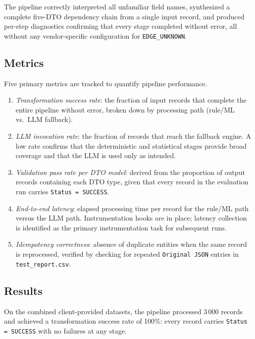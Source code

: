\documentclass{article}
\begin{document}
The pipeline correctly interpreted all unfamiliar field names, synthesized a complete
five-DTO dependency chain from a single input record, and produced per-step diagnostics
confirming that every stage completed without error, all without any vendor-specific
configuration for \texttt{EDGE\_UNKNOWN}.

\subsection{Metrics}
Five primary metrics are tracked to quantify pipeline performance.

\begin{enumerate}
  \item \emph{Transformation success rate}: the fraction of input records that complete the
  entire pipeline without error, broken down by processing path (rule/ML vs.\ LLM fallback).
  \item \emph{LLM invocation rate}: the fraction of records that reach the fallback engine.
  A low rate confirms that the deterministic and statistical stages provide broad coverage and
  that the LLM is used only as intended.
  \item \emph{Validation pass rate per DTO model}: derived from the proportion of output
  records containing each DTO type, given that every record in the evaluation run carries
  \texttt{Status = SUCCESS}.
  \item \emph{End-to-end latency}: elapsed processing time per record for the rule/ML path
  versus the LLM path. Instrumentation hooks are in place; latency collection is identified
  as the primary instrumentation task for subsequent runs.
  \item \emph{Idempotency correctness}: absence of duplicate entities when the same record is
  reprocessed, verified by checking for repeated \texttt{Original JSON} entries in
  \texttt{test\_report.csv}.
\end{enumerate}

\subsection{Results}
On the combined client-provided datasets, the pipeline processed 3\,000 records and achieved
a transformation success rate of 100\%: every record carries \texttt{Status = SUCCESS} with
no failures at any stage. 
\end{document}
